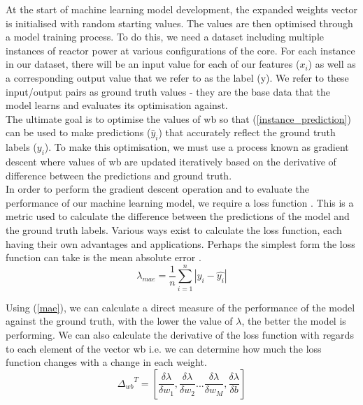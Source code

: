 \noindent
At the start of machine learning model development, the expanded weights vector is initialised with random starting values. The values are then optimised through a model training process. To do this, we need a dataset including multiple instances of reactor power at various configurations of the core. For each instance in our dataset, there will be an input value for each of our features ($x_i$) as well as a corresponding output value that we refer to as the label (y). We refer to these input/output pairs as ground truth values - they are the base data that the model learns and evaluates its optimisation against.
\\

\noindent
The ultimate goal is to optimise the values of wb so that (\ref{instance_prediction}) can be used to make predictions ($\hat{y}_i$) that accurately reflect the ground truth labels ($y_i$). To make this optimisation, we must use a process known as gradient descent \cite{ruder2016overview} where values of wb are updated iteratively based on the derivative of difference between the predictions and ground truth. \\

\noindent
In order to perform the gradient descent operation and to evaluate the performance of our machine learning model, we require a loss function \cite{wang2022comprehensive}. This is a metric used to calculate the difference between the predictions of the model and the ground truth labels. Various ways exist to calculate the loss function, each having their own advantages and applications. Perhaps the simplest form the loss function can take is the mean absolute error \cite{willmott2005advantages}.\\

\begin{equation} \label{mae}
	\lambda_{mae} = \frac{1}{n}\sum_{i=1}^n | y_i - \hat{y_i} | 
\end{equation}

\noindent
Using (\ref{mae}), we can calculate a direct measure of the performance of the model against the ground truth, with the lower the value of $\lambda$, the better the model is performing.  We can also calculate the derivative of the loss function with regards to each element of the vector wb i.e. we can determine how much the loss function changes with a change in each weight. \\

\begin{equation} \label{derivative}
	{\Delta_{wb}}^T = [\frac{\delta\lambda}{\delta w_1}, \frac{\delta\lambda}{\delta w_2} ... \frac{\delta\lambda}{\delta w_M}, \frac{\delta\lambda}{\delta b}]
\end{equation}

